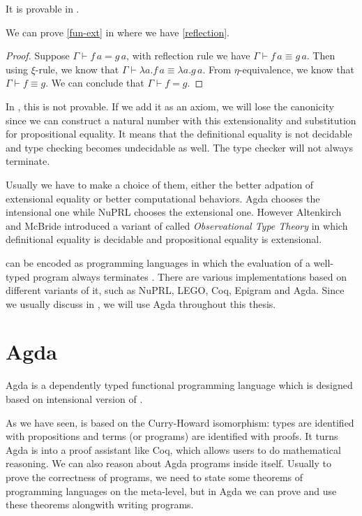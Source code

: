 It is provable in \ett.

\begin{lemma}
\label{functional extensionality is available in ett}
We can prove \ref{fun-ext} in \ett where we have \ref{reflection}.
\end{lemma}
 
\begin{proof}
Suppose $\Gamma \vdash f \,a = g \,a$, with reflection rule we have $\Gamma \vdash f \,a \equiv g \,a$.
Then using $\xi$-rule, we know that $\Gamma \vdash \lambda a . f \,a \equiv \lambda a . g \,a$.
From $\eta$-equivalence, we know that $\Gamma \vdash f \equiv g$. We can conclude that $\Gamma \vdash f = g$.
\end{proof}

In \itt, this is not provable. If we add it as an axiom, we will lose the canonicity since we can construct a natural number with this extensionality and substitution for propositional equality. It means that the definitional equality is not decidable and type checking becomes undecidable as well. The type checker will not always terminate.


Usually we have to make a choice of them, either the better adpation of extensional equality or better computational behaviors. Agda chooses the intensional one while NuPRL chooses the extensional one. However
Altenkirch and McBride introduced a variant of \ett called
\emph{Observational Type Theory}  \cite{alt:06} in which definitional equality is
decidable and propositional equality is extensional.


\mltt can be encoded as programming languages in
which the evaluation of a well-typed program always terminates \cite{nor:90}.
There are various implementations based on different variants of it, such as
NuPRL, LEGO, Coq, Epigram and Agda. Since we usually discuss in \itt, we will use Agda throughout this thesis.

\section{Agda}



Agda is a dependently typed functional programming language which is designed based on intensional version
of \mltt{} \cite{agdawiki:main}. 

As we have seen, \mltt{} is based on the Curry-Howard
isomorphism: types are identified with propositions and terms (or programs) are identified with proofs. It turns Agda is into a proof assistant like Coq, which allows users to do mathematical reasoning. We can also reason about Agda programs inside itself.
Usually to prove the correctness of programs, we need to state some theorems of programming languages on the meta-level, but in Agda we can prove and use these theorems alongwith writing programs.

